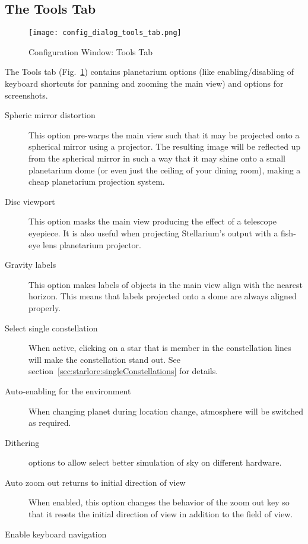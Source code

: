 \subsection{The Tools Tab}
\label{sec:gui:configuration:tools}

\begin{figure}[htbp]
\centering\texttt{[image: config\_dialog\_tools\_tab.png]}
\caption{Configuration Window: Tools Tab}
\label{fig:gui:configuration:tools}
\end{figure}

The Tools tab (Fig.~\ref{fig:gui:configuration:tools}) contains planetarium options 
(like enabling/disabling of keyboard shortcuts for panning and zooming the main view) 
and options for screenshots.

\begin{description}
\item[Spheric mirror distortion] This option pre-warps the main view
  such that it may be projected onto a spherical mirror using a
  projector. The resulting image will be reflected up from the spherical
  mirror in such a way that it may shine onto a small planetarium
  dome (or even just the ceiling of your dining room), making a cheap planetarium projection system.
\item[Disc viewport] This option masks the main view
  producing the effect of a telescope eyepiece. It is also useful when
  projecting Stellarium's output with a fish-eye lens planetarium
  projector.
\item[Gravity labels] This option makes labels of objects in the
  main view align with the nearest horizon. This means that labels
  projected onto a dome are always aligned properly.
\item[Select single constellation] When active, clicking on a star
  that is member in the constellation lines will make the
  constellation stand out. See section~\ref{sec:starlore:singleConstellations} for details.
\item[Auto-enabling for the environment] When changing planet during
  location change, atmosphere will be switched as required.
\item[Dithering] options to allow select better simulation of sky on different hardware.
\item[Auto zoom out returns to initial direction of view] When enabled,
  this option changes the behavior of the zoom out key
  \key{\textbackslash{}} so that it resets the initial direction of view in
  addition to the field of view.
\item[Enable keyboard navigation]

\end{description}
